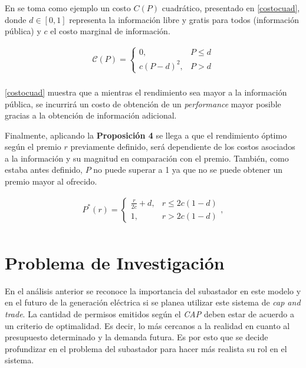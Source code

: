En  se toma como ejemplo un costo $C(P)$ cuadrático, presentado en \ref{costocuad}, donde $d \in [0,1]$ representa la información libre y gratis para todos (información pública) y $c$ el costo marginal de información. 

\begin{equation}
\begin{array}{rrclcl}
    {\mathcal{C}}(P)=\begin{cases}0,&P\leq d\\c(P-d)^2,&P>d\end{cases}\label{costocuad}\\
\end{array}
\end{equation}

\ref{costocuad} muestra que a mientras el rendimiento sea mayor a la información pública, se incurrirá un costo de obtención de un \textit{performance} mayor posible gracias a la obtención de información adicional.
\vspace{2.5mm}

Finalmente, aplicando la \textbf{Proposición 4} se llega a que el rendimiento óptimo según el premio $r$ previamente definido, será dependiente de los costos asociados a la información y su magnitud en comparación con el premio. También, como estaba antes definido, $P$ no puede superar a 1 ya que no se puede obtener un premio mayor al ofrecido.

\begin{equation}
\begin{array}{rrclcl}
    P^*(r) = \begin{cases}\frac{r}{2c}+d,&r\leq 2c(1-d)\\1,&r>2c(1-d)\end{cases}, \label{perforopt}\\
\end{array}
\end{equation}


\section{Problema de Investigación}

En el análisis anterior se reconoce la importancia del subastador en este modelo y en el futuro de la generación eléctrica si se planea utilizar este sistema de \textit{cap and trade}. La cantidad de permisos emitidos según el \textit{CAP} deben estar de acuerdo a un criterio de optimalidad. Es decir, lo más cercanos a la realidad en cuanto al presupuesto determinado y la demanda futura. Es por esto que se decide profundizar en el problema del subastador para hacer más realista su rol en el sistema.
\vspace{2.5mm}

